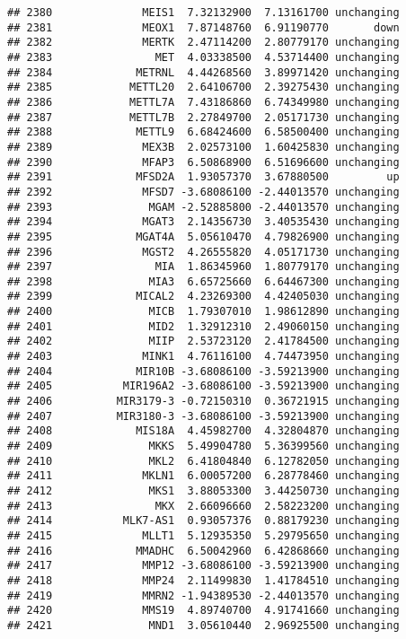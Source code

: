 \documentclass[]{article}
\begin{document}
\begin{verbatim}
## 2380              MEIS1  7.32132900  7.13161700 unchanging
## 2381              MEOX1  7.87148760  6.91190770       down
## 2382              MERTK  2.47114200  2.80779170 unchanging
## 2383                MET  4.03338500  4.53714400 unchanging
## 2384             METRNL  4.44268560  3.89971420 unchanging
## 2385            METTL20  2.64106700  2.39275430 unchanging
## 2386            METTL7A  7.43186860  6.74349980 unchanging
## 2387            METTL7B  2.27849700  2.05171730 unchanging
## 2388             METTL9  6.68424600  6.58500400 unchanging
## 2389              MEX3B  2.02573100  1.60425830 unchanging
## 2390              MFAP3  6.50868900  6.51696600 unchanging
## 2391             MFSD2A  1.93057370  3.67880500         up
## 2392              MFSD7 -3.68086100 -2.44013570 unchanging
## 2393               MGAM -2.52885800 -2.44013570 unchanging
## 2394              MGAT3  2.14356730  3.40535430 unchanging
## 2395             MGAT4A  5.05610470  4.79826900 unchanging
## 2396              MGST2  4.26555820  4.05171730 unchanging
## 2397                MIA  1.86345960  1.80779170 unchanging
## 2398               MIA3  6.65725660  6.64467300 unchanging
## 2399             MICAL2  4.23269300  4.42405030 unchanging
## 2400               MICB  1.79307010  1.98612890 unchanging
## 2401               MID2  1.32912310  2.49060150 unchanging
## 2402               MIIP  2.53723120  2.41784500 unchanging
## 2403              MINK1  4.76116100  4.74473950 unchanging
## 2404             MIR10B -3.68086100 -3.59213900 unchanging
## 2405           MIR196A2 -3.68086100 -3.59213900 unchanging
## 2406          MIR3179-3 -0.72150310  0.36721915 unchanging
## 2407          MIR3180-3 -3.68086100 -3.59213900 unchanging
## 2408             MIS18A  4.45982700  4.32804870 unchanging
## 2409               MKKS  5.49904780  5.36399560 unchanging
## 2410               MKL2  6.41804840  6.12782050 unchanging
## 2411              MKLN1  6.00057200  6.28778460 unchanging
## 2412               MKS1  3.88053300  3.44250730 unchanging
## 2413                MKX  2.66096660  2.58223200 unchanging
## 2414           MLK7-AS1  0.93057376  0.88179230 unchanging
## 2415              MLLT1  5.12935350  5.29795650 unchanging
## 2416             MMADHC  6.50042960  6.42868660 unchanging
## 2417              MMP12 -3.68086100 -3.59213900 unchanging
## 2418              MMP24  2.11499830  1.41784510 unchanging
## 2419              MMRN2 -1.94389530 -2.44013570 unchanging
## 2420              MMS19  4.89740700  4.91741660 unchanging
## 2421               MND1  3.05610440  2.96925500 unchanging

\end{verbatim}
\end{document}
